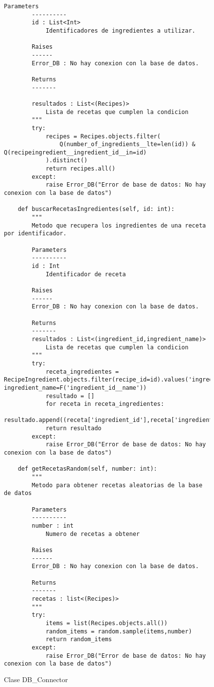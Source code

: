 \begin{figure}[H]
\begin{lstlisting}[style=python]
        Parameters
        ----------
        id : List<Int>
            Identificadores de ingredientes a utilizar.

        Raises
        ------
        Error_DB : No hay conexion con la base de datos.

        Returns
        -------
            
        resultados : List<(Recipes)>
            Lista de recetas que cumplen la condicion
        """
        try:
            recipes = Recipes.objects.filter(
                Q(number_of_ingredients__lte=len(id)) & Q(recipeingredient__ingredient_id__in=id)
            ).distinct()
            return recipes.all()
        except:
            raise Error_DB("Error de base de datos: No hay conexion con la base de datos")
        
    def buscarRecetasIngredientes(self, id: int):
        """
        Metodo que recupera los ingredientes de una receta por identificador.

        Parameters
        ----------
        id : Int
            Identificador de receta

        Raises
        ------
        Error_DB : No hay conexion con la base de datos.

        Returns
        -------
        resultados : List<(ingredient_id,ingredient_name)>
            Lista de recetas que cumplen la condicion
        """
        try:
            receta_ingredientes = RecipeIngredient.objects.filter(recipe_id=id).values('ingredient_id', ingredient_name=F('ingredient_id__name'))
            resultado = []
            for receta in receta_ingredientes:
                resultado.append((receta['ingredient_id'],receta['ingredient_name']))
            return resultado
        except:
            raise Error_DB("Error de base de datos: No hay conexion con la base de datos")
        
    def getRecetasRandom(self, number: int):
        """
        Metodo para obtener recetas aleatorias de la base de datos

        Parameters
        ----------
        number : int
            Numero de recetas a obtener

        Raises
        ------
        Error_DB : No hay conexion con la base de datos.

        Returns
        -------
        recetas : list<(Recipes)>
        """
        try:
            items = list(Recipes.objects.all())
            random_items = random.sample(items,number)
            return random_items
        except:
            raise Error_DB("Error de base de datos: No hay conexion con la base de datos")
\end{lstlisting}
\caption{Clase DB\_Connector}
\label{sni:db}
\end{figure}

